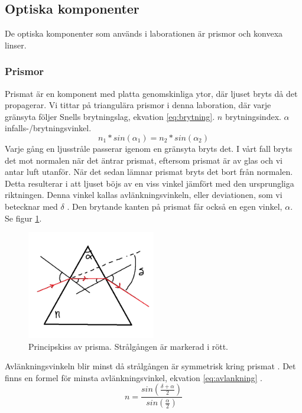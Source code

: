 \documentclass[a4paper]{article}
\begin{document}
\subsection{Optiska komponenter}
De optiska komponenter som används i laborationen är prismor och konvexa linser.
\subsubsection{Prismor}
Prismat är en komponent med platta genomskinliga ytor, där ljuset bryts då det propagerar. Vi tittar på triangulära prismor i denna laboration,
där varje gränsyta följer Snells brytningslag, ekvation \ref{eq:brytning}\cite[p.202]{vl}. $n$ brytningsindex. $\alpha$ infalls-/brytningsvinkel.
\begin{equation}
    n_1*sin(\alpha_1) = n_2*sin(\alpha_2)
    \label{eq:brytning}
\end{equation}
Varje gång en ljusstråle passerar igenom en gränsyta bryts det. I vårt fall bryts det mot normalen när det äntrar prismat, eftersom prismat är av glas och vi antar luft utanför.
När det sedan lämnar prismat bryts det bort från normalen. Detta resulterar i att ljuset böjs av en viss vinkel jämfört med den ursprungliga riktningen. Denna vinkel kallas
avlänkningsvinkeln, eller deviationen, som vi betecknar med $\delta$ . Den brytande kanten på prismat får också en egen vinkel, $\alpha$. Se figur \ref{fig:prism}.
\begin{figure}[h!]
    \centering
    \includegraphics[width=0.5\textwidth]{prism.png}
    \caption{Principskiss av prisma. Strålgången är markerad i rött.}
    \label{fig:prism}
\end{figure}
Avlänkningsvinkeln blir minst då strålgången är symmetrisk kring prismat \cite[p.210-211]{vl}. Det finns en formel för minsta avlänkningsvinkel, ekvation \ref{eq:avlankning} \cite[p.212]{vl}.
\begin{equation}
    n = \frac{sin(\frac{\delta +\alpha}{2})}{sin(\frac{\alpha}{2})}
    \label{eq:avlankning}
\end{equation}
\end{document}
